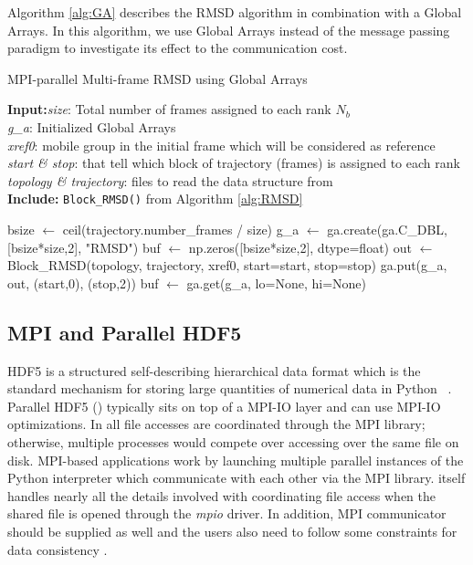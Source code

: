 Algorithm \ref{alg:GA} describes the RMSD algorithm in combination with a Global Arrays.
In this algorithm, we use Global Arrays instead of the message passing paradigm to investigate its effect to the communication cost. 

\begin{algorithm}[ht!]
	\scriptsize
	\caption{MPI-parallel Multi-frame RMSD using Global Arrays}
	\label{alg:GA}
	\hspace*{\algorithmicindent} \textbf{Input:}\emph{size}: Total number of frames assigned to each rank $N_{b}$\\
	\hspace*{\algorithmicindent} \emph{g\_a}: Initialized Global Arrays \\
	\hspace*{\algorithmicindent} \emph{xref0}: mobile group in the initial frame which will be considered as reference \\
	\hspace*{\algorithmicindent} \emph{start \& stop}: that tell which block of trajectory (frames) is assigned to each rank \\
	\hspace*{\algorithmicindent} \emph{topology \& trajectory}: files to read the data structure from \\
	\hspace*{\algorithmicindent}\textbf{Include:} \texttt{Block\_RMSD()} from Algorithm \ref{alg:RMSD}
	\begin{algorithmic}[1]
		
		\State bsize $\leftarrow$ ceil(trajectory.number\_frames / size)
		\State g\_a $\leftarrow$ ga.create(ga.C\_DBL, [bsize*size,2], "RMSD")
		\State buf $\leftarrow$ np.zeros([bsize*size,2], dtype=float)
		\State out $\leftarrow$ Block\_RMSD(topology, trajectory, xref0, start=start, stop=stop)
		\State ga.put(g\_a, out, (start,0), (stop,2))
		\State buf $\leftarrow$ ga.get(g\_a, lo=None, hi=None)
		\EndIf
	\end{algorithmic}
\end{algorithm}

\subsection{MPI and Parallel HDF5}
HDF5 is a structured self-describing hierarchical data format which is the standard mechanism for storing large quantities of numerical data in Python ~\cite{pythonhdf5}.
Parallel HDF5 () typically sits on top of a MPI-IO layer and can use MPI-IO optimizations. 
In  all file accesses are coordinated through the MPI library; otherwise, multiple processes would compete over accessing over the same file on disk. 
MPI-based applications work by launching multiple parallel instances of the Python interpreter which communicate with each other via the MPI library. 
 itself handles nearly all the details involved with coordinating file access when the shared file is opened through the \emph{mpio} driver.
In addition, MPI communicator should be supplied as well and the users also need to follow some constraints for data consistency \cite{pythonhdf5}.

